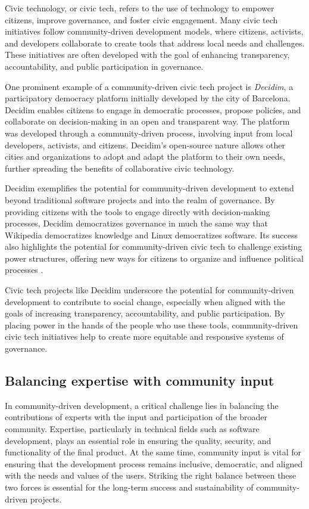 \begin{refsection}
Civic technology, or civic tech, refers to the use of technology to empower citizens, improve governance, and foster civic engagement. Many civic tech initiatives follow community-driven development models, where citizens, activists, and developers collaborate to create tools that address local needs and challenges. These initiatives are often developed with the goal of enhancing transparency, accountability, and public participation in governance.

One prominent example of a community-driven civic tech project is \textit{Decidim}, a participatory democracy platform initially developed by the city of Barcelona. Decidim enables citizens to engage in democratic processes, propose policies, and collaborate on decision-making in an open and transparent way. The platform was developed through a community-driven process, involving input from local developers, activists, and citizens. Decidim’s open-source nature allows other cities and organizations to adopt and adapt the platform to their own needs, further spreading the benefits of collaborative civic technology.

Decidim exemplifies the potential for community-driven development to extend beyond traditional software projects and into the realm of governance. By providing citizens with the tools to engage directly with decision-making processes, Decidim democratizes governance in much the same way that Wikipedia democratizes knowledge and Linux democratizes software. Its success also highlights the potential for community-driven civic tech to challenge existing power structures, offering new ways for citizens to organize and influence political processes \cite[pp.~110-113]{schweik2018}.

Civic tech projects like Decidim underscore the potential for community-driven development to contribute to social change, especially when aligned with the goals of increasing transparency, accountability, and public participation. By placing power in the hands of the people who use these tools, community-driven civic tech initiatives help to create more equitable and responsive systems of governance.

\subsection{Balancing expertise with community input}

In community-driven development, a critical challenge lies in balancing the contributions of experts with the input and participation of the broader community. Expertise, particularly in technical fields such as software development, plays an essential role in ensuring the quality, security, and functionality of the final product. At the same time, community input is vital for ensuring that the development process remains inclusive, democratic, and aligned with the needs and values of the users. Striking the right balance between these two forces is essential for the long-term success and sustainability of community-driven projects.


\end{refsection}
